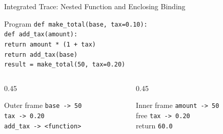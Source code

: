 \documentclass[aspectratio=169,10pt]{beamer}
\begin{document}
\begin{frame}{Integrated Trace: Nested Function and Enclosing Binding}
  \begin{block}{Program}
    \texttt{def make\_total(base, tax=0.10):}\\
    \hspace*{0.20in}\texttt{def add\_tax(amount):}\\
    \hspace*{0.40in}\texttt{return amount * (1 + tax)}\\
    \hspace*{0.20in}\texttt{return add\_tax(base)}\\[0.08in]
    \texttt{result = make\_total(50, tax=0.20)}
  \end{block}

  \begin{columns}[T,onlytextwidth]
    \begin{column}{0.45\textwidth}
      \begin{block}{Outer frame}
        \texttt{base -> 50}\\
        \texttt{tax -> 0.20}\\
        \texttt{add\_tax -> <function>}
      \end{block}
    \end{column}
    \begin{column}{0.45\textwidth}
      \begin{block}{Inner frame}
        \texttt{amount -> 50}\\
        free \texttt{tax -> 0.20}\\
        return \texttt{60.0}
      \end{block}
    \end{column}
  \end{columns}
\end{frame}
\end{document}
